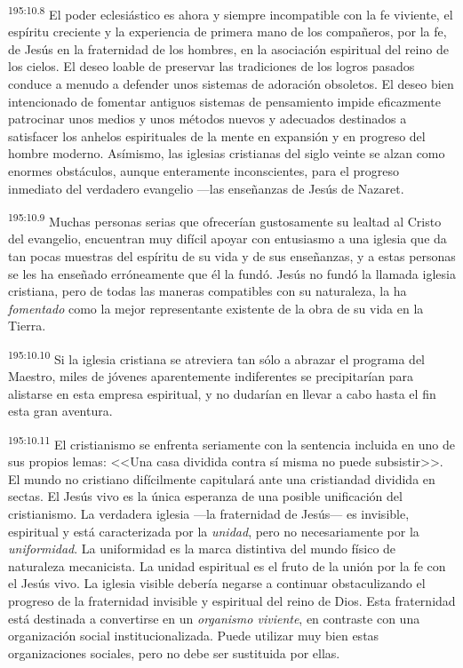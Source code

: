 \par 
\textsuperscript{195:10.8} El poder eclesiástico es ahora y siempre incompatible con la fe viviente, el espíritu creciente y la experiencia de primera mano de los compañeros, por la fe, de Jesús en la fraternidad de los hombres, en la asociación espiritual del reino de los cielos. El deseo loable de preservar las tradiciones de los logros pasados conduce a menudo a defender unos sistemas de adoración obsoletos. El deseo bien intencionado de fomentar antiguos sistemas de pensamiento impide eficazmente patrocinar unos medios y unos métodos nuevos y adecuados destinados a satisfacer los anhelos espirituales de la mente en expansión y en progreso del hombre moderno. Asímismo, las iglesias cristianas del siglo veinte se alzan como enormes obstáculos, aunque enteramente inconscientes, para el progreso inmediato del verdadero evangelio ---las enseñanzas de Jesús de Nazaret.

\par 
\textsuperscript{195:10.9} Muchas personas serias que ofrecerían gustosamente su lealtad al Cristo del evangelio, encuentran muy difícil apoyar con entusiasmo a una iglesia que da tan pocas muestras del espíritu de su vida y de sus enseñanzas, y a estas personas se les ha enseñado erróneamente que él la fundó. Jesús no fundó la llamada iglesia cristiana, pero de todas las maneras compatibles con su naturaleza, la ha \textit{fomentado} como la mejor representante existente de la obra de su vida en la Tierra.

\par 
\textsuperscript{195:10.10} Si la iglesia cristiana se atreviera tan sólo a abrazar el programa del Maestro, miles de jóvenes aparentemente indiferentes se precipitarían para alistarse en esta empresa espiritual, y no dudarían en llevar a cabo hasta el fin esta gran aventura.

\par 
\textsuperscript{195:10.11} El cristianismo se enfrenta seriamente con la sentencia incluida en uno de sus propios lemas: <<Una casa dividida contra sí misma no puede subsistir>>. El mundo no cristiano difícilmente capitulará ante una cristiandad dividida en sectas. El Jesús vivo es la única esperanza de una posible unificación del cristianismo. La verdadera iglesia ---la fraternidad de Jesús--- es invisible, espiritual y está caracterizada por la \textit{unidad}, pero no necesariamente por la \textit{uniformidad}. La uniformidad es la marca distintiva del mundo físico de naturaleza mecanicista. La unidad espiritual es el fruto de la unión por la fe con el Jesús vivo. La iglesia visible debería negarse a continuar obstaculizando el progreso de la fraternidad invisible y espiritual del reino de Dios. Esta fraternidad está destinada a convertirse en un \textit{organismo viviente}, en contraste con una organización social institucionalizada. Puede utilizar muy bien estas organizaciones sociales, pero no debe ser sustituida por ellas.


